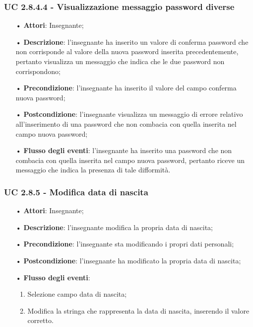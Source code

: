 \subsubsection{UC 2.8.4.4 - Visualizzazione messaggio password diverse}
\begin{itemize}
	\item[•]\textbf{Attori}: Insegnante;
	\item[•]\textbf{Descrizione}: l'insegnante ha inserito un valore di conferma password che non corrisponde al valore della nuova password inserita precedentemente, pertanto visualizza un messaggio che indica che le due password non corrispondono;
	\item[•]\textbf{Precondizione}: l'insegnante ha inserito il valore del campo conferma nuova password;
	\item[•]\textbf{Postcondizione}: l'insegnante visualizza un messaggio di errore relativo all'inserimento di una password che non combacia con quella inserita nel campo nuova password; 
	\item[•]\textbf{Flusso degli eventi}: l'insegnante ha inserito una password che non combacia con quella inserita nel campo nuova password, pertanto riceve un messaggio che indica la presenza di tale difformità.
\end{itemize}
	
	
\subsubsection{UC 2.8.5 - Modifica data di nascita}
\begin{itemize}
	\item[•]\textbf{Attori}: Insegnante;
	\item[•]\textbf{Descrizione}: l'insegnante modifica la propria data di nascita;
	\item[•]\textbf{Precondizione}: l'insegnante sta modificando i propri dati personali;
	\item[•]\textbf{Postcondizione}: l'insegnante ha modificato la propria data di nascita; 
	\item[•]\textbf{Flusso degli eventi}: 
	\begin{enumerate}
		\item Selezione campo data di nascita;
		\item Modifica la stringa che rappresenta la data di nascita, inserendo il valore corretto.
	\end{enumerate}
\end{itemize}

